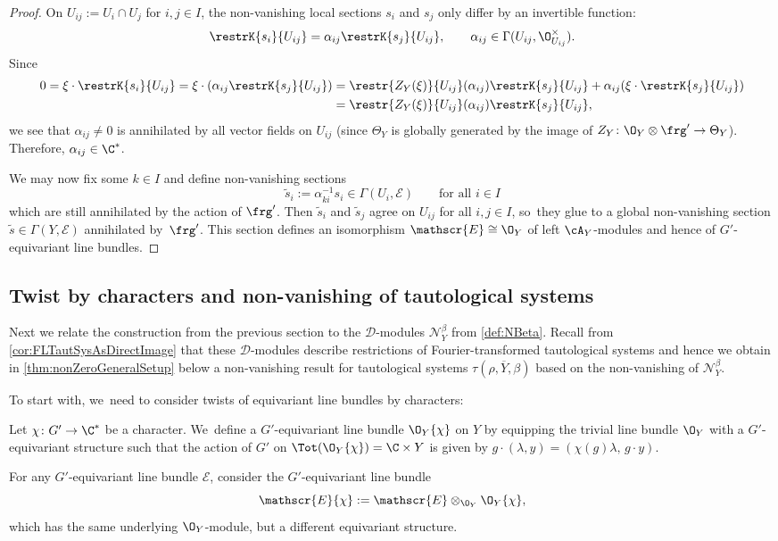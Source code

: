 \begin{proof}
On $U_{ij} := U_i \cap U_j$ for $i,j \in I$, the non-vanishing local sections $s_i$ and $s_j$ only differ by an invertible function:
\[
\restrK{s_i}{U_{ij}} = \alpha_{ij} \restrK{s_j}{U_{ij}}, \qquad \alpha_{ij} \in \Gamma(U_{ij},\O_{U_{ij}}^\times).
\]
Since
\begin{align*}
0 = \xi \cdot \restrK{s_i}{U_{ij}} = \xi \cdot (\alpha_{ij} \restrK{s_j}{U_{ij}}) &= \restr{Z_Y(\xi)}{U_{ij}}(\alpha_{ij}) \restrK{s_j}{U_{ij}} + \alpha_{ij} (\xi \cdot \restrK{s_j}{U_{ij}}) \\
&= \restr{Z_Y(\xi)}{U_{ij}}(\alpha_{ij}) \restrK{s_j}{U_{ij}},
\end{align*}
we see that $\alpha_{ij} \neq 0$ is annihilated by all vector fields on $U_{ij}$ (since $\Theta_Y$ is globally generated by the image of $Z_Y \colon \O_Y \otimes \frg' \to \Theta_Y$). Therefore, $\alpha_{ij} \in \C^*$.

We may now fix some $k \in I$ and define non-vanishing sections
\[
\tilde s_i := \alpha_{ki}^{-1} s_i \in \Gamma(U_i,\mathscr{E}) \qquad \text{for all } i \in I
\]
which are still annihilated by the action of $\frg'$.
Then $\tilde s_i$ and $\tilde s_j$ agree on $U_{ij}$ for all $i,j \in I$, so~they glue to a global non-vanishing section $\tilde s \in \Gamma(Y,\mathscr{E})$ annihilated by~$\frg'$. This section defines an isomorphism $\mathscr{E} \cong \O_Y$ of left $\cA_Y$\nobreakdash-mod\-ules and hence of $G'$\nobreakdash-equi\-variant line bundles.
\end{proof}

\subsection{Twist by characters and non-vanishing of tautological systems} \label{sec:Twists}

Next we relate the construction from the previous section to the $\mathscr D$\nobreakdash-mod\-ules $\mathscr N_Y^\beta$ from \cref{def:NBeta}. Recall from \cref{cor:FLTautSysAsDirectImage} that these $\mathscr D$\nobreakdash-mod\-ules describe restrictions of Fourier-transformed tautological systems and hence we obtain in \cref{thm:nonZeroGeneralSetup} below a non-vanishing result for tautological systems $\tau(\rho, \overline Y, \beta)$ based on the non-vanishing of $\mathscr N_Y^\beta$.

To start with, we~need to consider twists of equivariant line bundles by characters:

\begin{dfn}\label{def:EquLineChar}
Let $\chi \colon G' \to \C^*$ be a character. We~define a $G'$-equivariant line bundle $\O_Y\{\chi\}$ on $Y$ by equipping the trivial line bundle $\O_Y$ with a $G'$-equivariant structure such that the action of $G'$ on $\Tot(\O_Y\{\chi\}) = \C \times Y$ is given by $g \cdot (\lambda,y) = (\chi(g)\lambda, \, g \cdot y)$.

For any $G'$-equivariant line bundle $\mathscr{E}$, consider the $G'$-equivariant line bundle
\[
\mathscr{E}\{\chi\} := \mathscr{E} \otimes_{\O_Y} \O_Y\{\chi\},
\]
which has the same underlying $\O_Y$\nobreakdash-mod\-ule, but a different equivariant structure.
\end{dfn}

